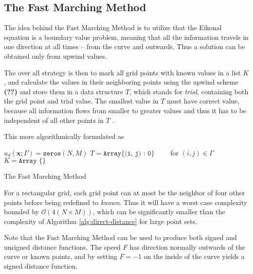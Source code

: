 \subsection{The Fast Marching Method}
The idea behind the Fast Marching Method is to utilize that the Eikonal equation is a boundary value problem, meaning that all the information travels in one direction at all times -- from the curve and outwards. Thus a solution can be obtained only from upwind values. 


The over all strategy is then to mark all grid points with known values in a list $K$, and calculate the values in their neighboring points using the upwind scheme \textbf{(??)} and store them in a data structure $T$, which stands for \textit{trial}, containing both the grid point and trial value. The smallest value in $T$ must have correct value, because all information flows from smaller to greater values and thus it has to be independent of all other points in $T$ \cite{sethian1999level}.

This more algorithmically formulated as \\
\begin{algorithm}[H]
\SetAlgoLined
$u_d(\mathbf{x}; \Gamma)=\texttt{zeros}(N,M)$\;
$T = \texttt{Array\{ (i, j) : 0\}} \qquad$ for $(i, j) \in \Gamma$\; 
$K = \texttt{Array \{\}}$


 \caption{The Fast Marching Method}
 \label{alg:idea-fmm}
\end{algorithm}

For a rectangular grid, each grid point can at most be the neighbor of four other points before being redefined to \textit{known}. Thus it will have a worst case complexity bounded by $\mathcal{O}(4 (N\times M))$, which can be significantly smaller than the complexity of Algorithm \ref{alg:direct-distance} for large point sets.

Note that the Fast Marching Method can be used to produce both signed and unsigned distance functions. The speed $F$ has direction normally outwards of the curve or known points, and by setting $F=-1$ on the inside of the curve yields a signed distance function.

